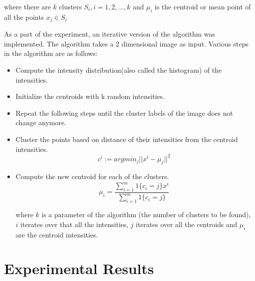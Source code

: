 \documentclass[conference]{IEEEtran}
\begin{document}
where there are \begin{math}k\end{math} clusters \begin{math} S_{i},i=1,2,...,k \end{math} and \begin{math} \mu_{i} \end{math} is the centroid or mean point of all the points \begin{math}x_{j} \in S_{i}\end{math} 

As a part of the experiment, an iterative version of the algorithm was implemented. The algorithm takes a 2 dimensional image as input. Various steps in the algorithm are as follows:

\begin{itemize}
	\item Compute the intensity distribution(also called the histogram) of the intensities.
	\item Initialize the centroids with k random intensities.
	\item Repeat the following steps until the cluster labels of the image does not change anymore.
	\item Cluster the points based on distance of their intensities from the centroid intensities.
	\begin{equation}
		c^{i} := arg min_{j}||x^{i} - \mu_{j}||^2
	\end{equation}
	\item Compute the new centroid for each of the clusters.
	\begin{equation}
		\mu_{i} = \frac{\sum\limits_{i=1}^{m} 1\{c_{i} = j\}x^i}{\sum\limits_{i=1}^{m} 1\{c_{i} = j\}}
	\end{equation}
	
	where \begin{math}k\end{math} is a parameter of the algorithm (the number of clusters to be found), \begin{math}i\end{math} iterates over that all the intensities, \begin{math}j\end{math} iterates over all the centroids and \begin{math}\mu_{i}\end{math} are the centroid intensities.
\end{itemize}
	

\section{Experimental Results}
\end{document}

